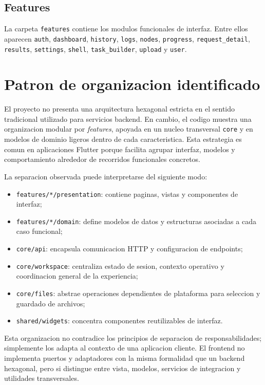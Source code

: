 \documentclass[conference]{IEEEtran}
\begin{document}
\subsection{Features}
La carpeta \texttt{features} contiene los modulos funcionales de interfaz. Entre ellos aparecen \texttt{auth}, \texttt{dashboard}, \texttt{history}, \texttt{logs}, \texttt{nodes}, \texttt{progress}, \texttt{request\_detail}, \texttt{results}, \texttt{settings}, \texttt{shell}, \texttt{task\_builder}, \texttt{upload} y \texttt{user}.

\section{Patron de organizacion identificado}
El proyecto no presenta una arquitectura hexagonal estricta en el sentido tradicional utilizado para servicios backend. En cambio, el codigo muestra una organizacion modular por \emph{features}, apoyada en un nucleo transversal \texttt{core} y en modelos de dominio ligeros dentro de cada caracteristica. Esta estrategia es comun en aplicaciones Flutter porque facilita agrupar interfaz, modelos y comportamiento alrededor de recorridos funcionales concretos.

La separacion observada puede interpretarse del siguiente modo:
\begin{itemize}[leftmargin=*]
\item \texttt{features/*/presentation}: contiene paginas, vistas y componentes de interfaz;
\item \texttt{features/*/domain}: define modelos de datos y estructuras asociadas a cada caso funcional;
\item \texttt{core/api}: encapsula comunicacion HTTP y configuracion de endpoints;
\item \texttt{core/workspace}: centraliza estado de sesion, contexto operativo y coordinacion general de la experiencia;
\item \texttt{core/files}: abstrae operaciones dependientes de plataforma para seleccion y guardado de archivos;
\item \texttt{shared/widgets}: concentra componentes reutilizables de interfaz.
\end{itemize}

Esta organizacion no contradice los principios de separacion de responsabilidades; simplemente los adapta al contexto de una aplicacion cliente. El frontend no implementa puertos y adaptadores con la misma formalidad que un backend hexagonal, pero si distingue entre vista, modelos, servicios de integracion y utilidades transversales.
\end{document}
